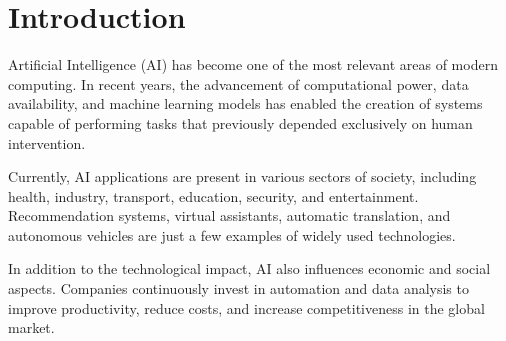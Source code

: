\section{Introduction}

Artificial Intelligence (AI) has become one of the most relevant areas of modern computing.
In recent years, the advancement of computational power, data availability, and machine
learning models has enabled the creation of systems capable of performing tasks that
previously depended exclusively on human intervention.

Currently, AI applications are present in various sectors of society, including health,
industry, transport, education, security, and entertainment. Recommendation systems,
virtual assistants, automatic translation, and autonomous vehicles are just a few examples
of widely used technologies.

In addition to the technological impact, AI also influences economic and social aspects. Companies
continuously invest in automation and data analysis to improve productivity,
reduce costs, and increase competitiveness in the global market. 